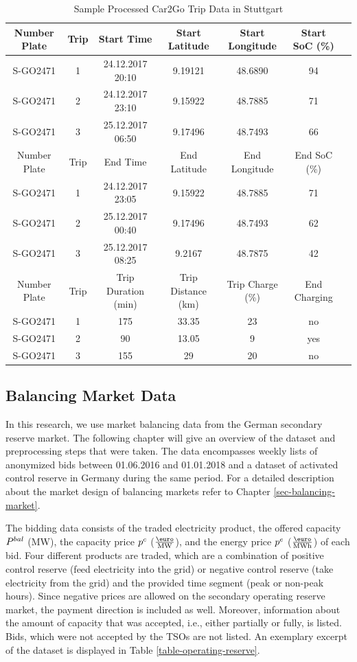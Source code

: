 \documentclass[a4paper, 12pt]{article}
\begin{document}
\begin{table}
    \caption{Sample Processed Car2Go Trip Data in Stuttgart \label{table-car2go-processed}}
    \centering
    \begin{tabular}{cc|ccccc}
      \hline
      \hline
      Number Plate & Trip & Start Time & Start Latitude & Start Longitude & Start SoC (\%)\\
      \hline
      S-GO2471 & 1 & 24.12.2017 20:10 & 9.19121 & 48.6890 & 94\\
      S-GO2471 & 2 & 24.12.2017 23:10 & 9.15922 & 48.7885 & 71\\
      S-GO2471 & 3 & 25.12.2017 06:50 & 9.17496 & 48.7493 & 66\\
      \hline
      Number Plate & Trip & End Time & End Latitude & End Longitude & End SoC (\%)\\
      \hline
      S-GO2471 & 1 & 24.12.2017 23:05 & 9.15922 & 48.7885 & 71\\
      S-GO2471 & 2 & 25.12.2017 00:40 & 9.17496 & 48.7493 & 62\\
      S-GO2471 & 3 & 25.12.2017 08:25 & 9.2167 & 48.7875 & 42\\
      \hline
      Number Plate & Trip & Trip Duration (min) & Trip Distance (km) & Trip Charge (\%) & End Charging\\
      \hline
      S-GO2471 & 1 & 175 & 33.35 & 23 & no\\
      S-GO2471 & 2 & 90 & 13.05 & 9 & yes\\
      S-GO2471 & 3 & 155 & 29 & 20 & no\\
      \hline
      \hline
    \end{tabular}
\end{table}

\subsection{Balancing Market Data \label{sec-data-balancing}}
\label{sec:orga955b4d}
In this research, we use market balancing data from the German secondary reserve
market. The following chapter will give an overview of the dataset and
preprocessing steps that were taken. The data encompasses weekly lists of
anonymized bids between 01.06.2016 and 01.01.2018 and a dataset of activated
control reserve in Germany during the same period. For a detailed description
about the market design of balancing markets refer to Chapter
\ref{sec-balancing-market}.

The bidding data consists of the traded electricity product, the offered
capacity \(P^{bal}_{}\) (MW), the capacity price \(p^c_{}\) (\(\emw\)), and the
energy price \(p^e_{}\) (\(\emwh\)) of each bid. Four different products
are traded, which are a combination of positive control reserve (feed
electricity into the grid) or negative control reserve (take electricity from
the grid) and the provided time segment (peak or non-peak hours). Since negative
prices are allowed on the secondary operating reserve market, the payment
direction is included as well. Moreover, information about the amount of
capacity that was accepted, i.e., either partially or fully, is listed. Bids,
which were not accepted by the TSOs are not listed. An exemplary excerpt of the
dataset is displayed in Table \ref{table-operating-reserve}.
\end{document}
